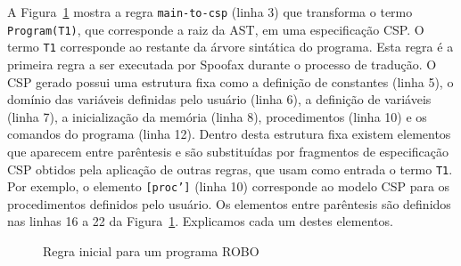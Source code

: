 A Figura~\ref{fig:rules} mostra a regra \texttt{main-to-csp} (linha 3) que transforma o termo \texttt{Program(T1)}, que corresponde a raiz da AST, em uma especificação CSP. O termo \texttt{T1} corresponde ao restante da árvore sintática do programa. Esta regra é a primeira regra a ser executada por Spoofax durante o processo de tradução. O CSP gerado possui uma estrutura fixa como a definição de constantes (linha 5), o domínio das variáveis definidas pelo usuário (linha 6), a definição de variáveis (linha 7), a inicialização da memória (linha 8), procedimentos (linha 10) e os comandos do programa (linha 12). Dentro desta estrutura fixa existem elementos que aparecem entre parêntesis e são substituídas por fragmentos de especificação CSP obtidos pela aplicação de outras regras, que usam como entrada o termo \texttt{T1}. Por exemplo, o elemento \texttt{[proc']} (linha 10) corresponde ao modelo CSP para os procedimentos definidos pelo usuário. Os elementos entre parêntesis são definidos nas linhas 16 a 22 da Figura~\ref{fig:rules}. Explicamos cada um destes elementos.


\begin{figure}[!h]
\centering
\caption{Regra inicial para um programa ROBO}

\label{fig:rules}
\end{figure}


